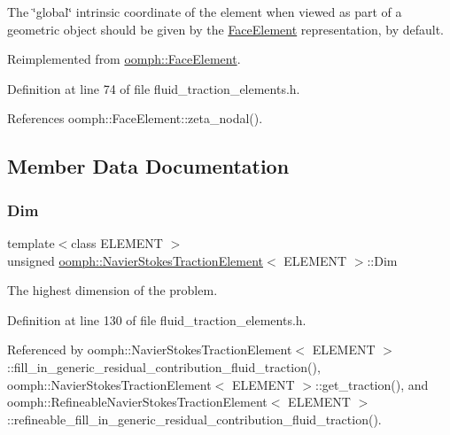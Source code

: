The \char`\"{}global\char`\"{} intrinsic coordinate of the element when viewed as part of a geometric object should be given by the \hyperlink{classoomph_1_1FaceElement}{Face\+Element} representation, by default. 



Reimplemented from \hyperlink{classoomph_1_1FaceElement_a58c9f93705c7741f76c8487d152e68a6}{oomph\+::\+Face\+Element}.



Definition at line 74 of file fluid\+\_\+traction\+\_\+elements.\+h.



References oomph\+::\+Face\+Element\+::zeta\+\_\+nodal().



\subsection{Member Data Documentation}
\mbox{\label{classoomph_1_1NavierStokesTractionElement_a93c55d3fa89463f7a39ed84998c569d0}} 
\subsubsection{\texorpdfstring{Dim}{Dim}}
{\footnotesize\ttfamily template$<$class E\+L\+E\+M\+E\+NT $>$ \\
unsigned \hyperlink{classoomph_1_1NavierStokesTractionElement}{oomph\+::\+Navier\+Stokes\+Traction\+Element}$<$ E\+L\+E\+M\+E\+NT $>$\+::Dim\hspace{0.3cm}{\ttfamily [protected]}}



The highest dimension of the problem. 



Definition at line 130 of file fluid\+\_\+traction\+\_\+elements.\+h.



Referenced by oomph\+::\+Navier\+Stokes\+Traction\+Element$<$ E\+L\+E\+M\+E\+N\+T $>$\+::fill\+\_\+in\+\_\+generic\+\_\+residual\+\_\+contribution\+\_\+fluid\+\_\+traction(), oomph\+::\+Navier\+Stokes\+Traction\+Element$<$ E\+L\+E\+M\+E\+N\+T $>$\+::get\+\_\+traction(), and oomph\+::\+Refineable\+Navier\+Stokes\+Traction\+Element$<$ E\+L\+E\+M\+E\+N\+T $>$\+::refineable\+\_\+fill\+\_\+in\+\_\+generic\+\_\+residual\+\_\+contribution\+\_\+fluid\+\_\+traction().

